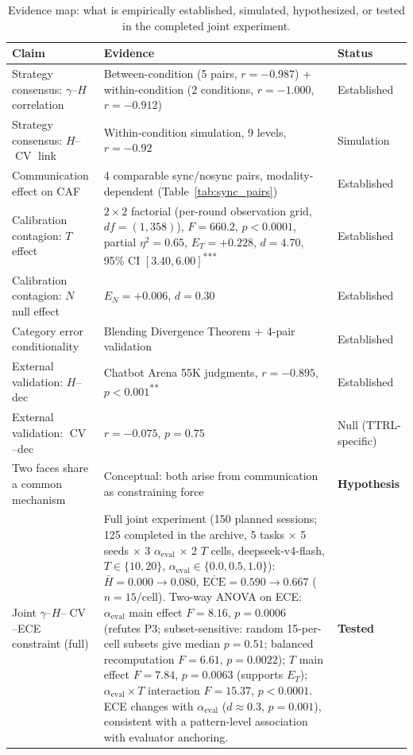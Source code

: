 \documentclass[11pt]{article}
\DeclareMathOperator{\CV}{CV}
\begin{document}
\begin{table}[t]
\centering
\caption{Evidence map: what is empirically established, simulated, hypothesized, or tested in the completed joint experiment.}
\label{tab:evidence}
\footnotesize
\begin{tabularx}{\textwidth}{@{}p{}X p{}@{}}
\toprule
\textbf{Claim} & \textbf{Evidence} & \textbf{Status} \\
\midrule
Strategy consensus: $\gamma$--$H$ correlation & Between-condition (5 pairs, $r{=}-0.987$) + within-condition (2 conditions, $r{=}-1.000$, $r{=}-0.912$)~\cite{liu2026impossible} & Established \\
Strategy consensus: $H$--$\CV$ link & Within-condition simulation, 9 levels, $r{=}-0.92$~\cite{liu2026impossible} & Simulation \\
Communication effect on CAF & 4 comparable sync/nosync pairs, modality-dependent (Table~\ref{tab:sync_pairs}) & Established \\
Calibration contagion: $T$ effect & $2{\times}2$ factorial (per-round observation grid, $df{=}(1,358)$), $F{=}660.2$, $p{<}0.0001$, partial $\eta^2{=}0.65$, $E_T{=}+0.228$, $d{=}4.70$, 95\% CI $[3.40, 6.00]$\textsuperscript{***}~\cite{liu2026calibration} & Established \\
Calibration contagion: $N$ null effect & $E_N{=}+0.006$, $d{=}0.30$~\cite{liu2026calibration} & Established \\
Category error conditionality & Blending Divergence Theorem + 4-pair validation~\cite{foerster2016learning,kapetanakis2014balanced} & Established \\
External validation: $H$--dec & Chatbot Arena 55K judgments, $r{=}-0.895$, $p{<}0.001$\textsuperscript{**}~\cite{zheng2023chatbot,chiang2024chatbot} & Established \\
External validation: $\CV$--dec & $r{=}-0.075$, $p{=}0.75$~\cite{zheng2023chatbot,chiang2024chatbot} & Null (TTRL-specific) \\
\midrule
Two faces share a common mechanism & Conceptual: both arise from communication as constraining force & \textbf{Hypothesis} \\
Joint $\gamma$--$H$--$\CV$--ECE constraint (full) & Full joint experiment (150 planned sessions; 125 completed in the archive, 5 tasks $\times$ 5 seeds $\times$ 3 $\alpha_{\text{eval}}$ $\times$ 2 $T$ cells, deepseek-v4-flash, $T \in \{10,20\}$, $\alpha_{\text{eval}} \in \{0.0,0.5,1.0\}$): $\bar{H} = 0.000 \to 0.080$, $\overline{\text{ECE}} = 0.590 \to 0.667$ ($n = 15$/cell). Two-way ANOVA on ECE: $\alpha_{\text{eval}}$ main effect $F = 8.16$, $p = 0.0006$ (refutes P3; subset-sensitive: random 15-per-cell subsets give median $p=0.51$; balanced recomputation $F=6.61$, $p=0.0022$); $T$ main effect $F = 7.84$, $p = 0.0063$ (supports $E_T$); $\alpha_{\text{eval}} \times T$ interaction $F = 15.37$, $p < 0.0001$. ECE changes with $\alpha_{\text{eval}}$ ($d \approx 0.3$, $p = 0.001$), consistent with a pattern-level association with evaluator anchoring. & \textbf{Tested} \\ 

\end{tabularx}
\end{table}
\end{document}
